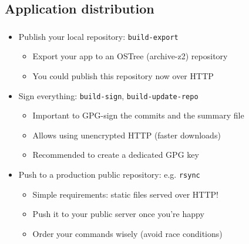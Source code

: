 \subsection{Application distribution}
\begin{frame}
  \frametitle{\insertsubsection}

    \begin{itemize}
    \item Publish your local repository: \texttt{build-export}
      \begin{itemize}
      \item Export your app to an OSTree (archive-z2) repository\vspacing
      \item You could publish this repository now over HTTP\vspacing
      \end{itemize}
    \item Sign everything: \texttt{build-sign}, \texttt{build-update-repo}
      \begin{itemize}
      \item Important to GPG-sign the commits and the summary file\vspacing
      \item Allows using unencrypted HTTP (faster downloads)\vspacing
      \item Recommended to create a dedicated GPG key\vspacing
      \end{itemize}
    \item Push to a production public repository: e.g. \texttt{rsync}
      \begin{itemize}
      \item Simple requirements: static files served over HTTP!\vspacing
      \item Push it to your public server once you're happy\vspacing
      \item Order your commands wisely (avoid race conditions)
      \end{itemize}
    \end{itemize}
\end{frame}


